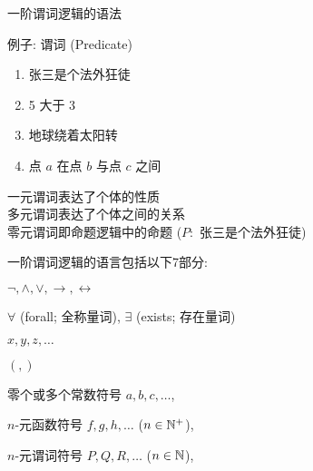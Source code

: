
\begin{frame}{}
  \begin{center}
    一阶谓词逻辑的语法

  \end{center}
\end{frame}

\begin{frame}{}
  \begin{exampleblock}{例子: 谓词 (Predicate)}
    \pause
    \begin{enumerate}[<+->][(1)]
      \setlength{\itemsep}{6pt}
      \item 张三是个法外狂徒
      \item 5 大于 3
      \item 地球绕着太阳转
      \item 点 $a$ 在点 $b$ 与点 $c$ 之间
    \end{enumerate}
  \end{exampleblock}

  \pause
  \vspace{0.30cm}
  \begin{center}
    一元谓词表达了个体的性质 \\[6pt]
    多元谓词表达了个体之间的关系 \\[6pt]
    零元谓词即命题逻辑中的命题 ($P:$ 张三是个法外狂徒)
  \end{center}
\end{frame}

\begin{frame}{}
  \begin{definition}
    一阶谓词逻辑的语言包括以下7部分: \\[5pt]
    \begin{description}
      \setlength{\itemsep}{5pt}
      \item [逻辑联词:] $\lnot, \land, \lor, \to, \leftrightarrow$
      \item [\purple{量词符号:}] $\forall$ (forall; 全称量词), $\exists$ (exists; 存在量词)
      \item [变元符号:] $x, y, z, \dots$
      \item [左右括号:] $(, )$
      \pause
      \vspace{0.50cm}
      \item [\cyan{常数符号:}] 零个或多个常数符号 $a, b, c, \dots$, 
      \item [\blue{函数符号:}] $n$-元函数符号 $f, g, h, \dots$ ($n \in \mathbb{N}^{+}$), 
      \item [\red{谓词符号:}] $n$-元谓词符号 $P, Q, R, \dots$ ($n \in \mathbb{N}$), 
    \end{description}
  \end{definition}
\end{frame}

